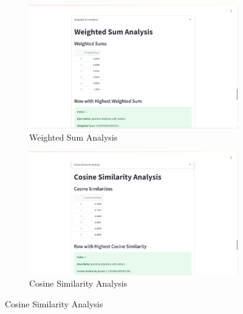 \begin{figure}[H]
    \centering
    \begin{subfigure}[b]{0.495\textwidth}
        \centering
        \includegraphics[width=\textwidth]{App Images/22 Interface.png}
        \caption*{Weighted Sum Analysis}
        \label{fig:weighted_sum}
    \end{subfigure}
    \hfill
    \begin{subfigure}[b]{0.495\textwidth}
        \centering
        \includegraphics[width=\textwidth]{App Images/23 Interface.png}
        \caption*{Cosine Similarity Analysis}
        \label{fig:cosine_similarity}
    \end{subfigure}
    \label{fig:analysis_comparison}
\end{figure}

\pagebreak

